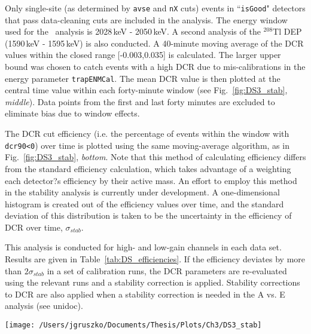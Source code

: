 Only single-site (as determined by {\tt avse} and {\tt nX} cuts) events in ``{\tt isGood}" detectors that pass data-cleaning cuts are included in the analysis. The energy window used for the \nonubb\ analysis is 2028\,keV - 2050\,keV. A second analysis of the $^{208}$Tl DEP (1590\,keV - 1595\,keV) is also conducted. A 40-minute moving average of the DCR values within the closed range [-0.003,0.035] is calculated. The larger upper bound was chosen to catch events with a high DCR due to mis-calibrations in the energy parameter {\tt trapENMCal}. The mean DCR value is then plotted at the central time value within each forty-minute window (see Fig.~\ref{fig:DS3_stab}, {\it middle}). Data points from the first and last forty minutes are excluded to eliminate bias due to window effects. 

The DCR cut efficiency (i.e.  the percentage of events within the window with {\tt dcr90<0}) over time is plotted using the same moving-average algorithm, as in Fig.~\ref{fig:DS3_stab}, {\it bottom}. Note that this method of calculating efficiency differs from the standard efficiency calculation, which takes advantage of a weighting each detector?s efficiency by their active mass.  An effort to employ this method in the stability analysis is currently under development. A one-dimensional histogram is created out of the efficiency values over time, and the standard deviation of this distribution is taken to be the uncertainty in the efficiency of DCR over time, $\sigma_{stab}$. 

This analysis is conducted for high- and low-gain channels in each data set. Results are given in Table~\ref{tab:DS_efficiencies}. If the efficiency deviates by more than $2\sigma_{stab}$ in a set of calibration runs, the DCR parameters are re-evaluated using the relevant runs and a stability correction is applied. Stability corrections to DCR are also applied when a stability correction is needed in the A vs. E analysis (see unidoc).

\begin{sidewaysfigure}[]
 \centering
 \texttt{[image: /Users/jgruszko/Documents/Thesis/Plots/Ch3/DS3\_stab]}
 \caption[DCR stability study results in DS3 high-gain channels]{Stability study results for DS3 high-gain channels. The middle and bottom figures are calculated using a 40-minute moving average; in these plots the filled dashed region indicates the uncertainty in each value, taken as the standard deviation of the value's distribution in a given time window. The magenta lines indicate the mean of the plotted values. {\it Top:} DCR values for all events passing cuts. {\it Middle:} The central value of DCR over time. {\it Bottom:} The bulk acceptance of the DCR cut over time. The vertical lines indicate the runtime boundaries of the long calibration run used to set the DCR cut, and the blue line indicates the average efficiency in this time window. Plots courtesy of Chris Haufe.} 
 \label{fig:DS3_stab}
\end{sidewaysfigure}


